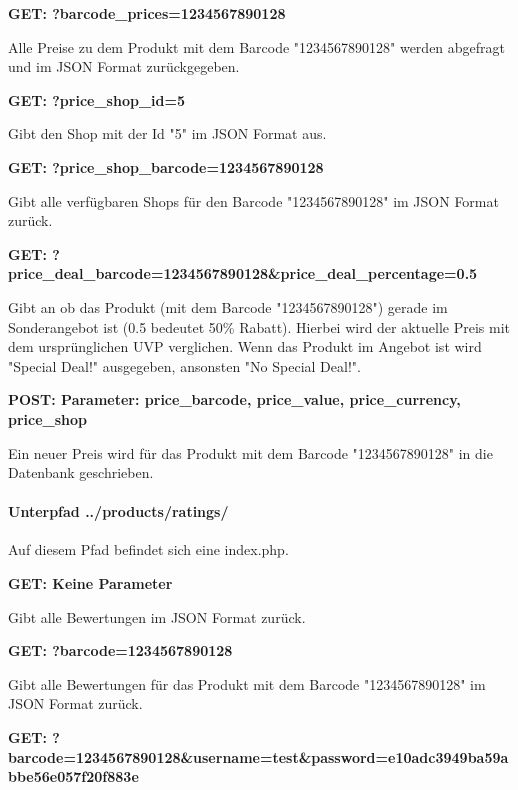 \documentclass{scrartcl}
\begin{document}
\noindent \textbf{GET: ?barcode\_prices=1234567890128}

\noindent Alle Preise zu dem Produkt mit dem Barcode "1234567890128" werden abgefragt und im JSON Format zurückgegeben. \newline 

\noindent \textbf{GET: ?price\_shop\_id=5}

\noindent Gibt den Shop mit der Id "5" im JSON Format aus. \newline

\noindent \textbf{GET: ?price\_shop\_barcode=1234567890128}

\noindent Gibt alle verfügbaren Shops für den Barcode "1234567890128" im JSON Format zurück. \newline

\noindent \textbf{GET: ?price\_deal\_barcode=1234567890128\&price\_deal\_percentage=0.5}

\noindent Gibt an ob das Produkt (mit dem Barcode "1234567890128") gerade im Sonderangebot ist (0.5 bedeutet 50\% Rabatt). Hierbei wird der aktuelle Preis mit dem ursprünglichen UVP verglichen. Wenn das Produkt im Angebot ist wird "Special Deal!" ausgegeben, ansonsten "No Special Deal!". \newline

\noindent \textbf{POST: Parameter: price\_barcode, price\_value, price\_currency, price\_shop}

\noindent Ein neuer Preis wird für das Produkt mit dem Barcode "1234567890128" in die Datenbank geschrieben.

\paragraph{Unterpfad ../products/ratings/}
Auf diesem Pfad befindet sich eine index.php. \newline

\noindent \textbf{GET: Keine Parameter}

\noindent Gibt alle Bewertungen im JSON Format zurück. \newline

\noindent \textbf{GET: ?barcode=1234567890128}

\noindent Gibt alle Bewertungen für das Produkt mit dem Barcode "1234567890128" im JSON Format zurück. \newline

\noindent \textbf{GET: ?barcode=1234567890128\newline\&username=test\&password=e10adc3949ba59abbe56e057f20f883e}
\end{document}
